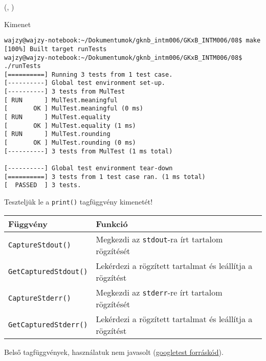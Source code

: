 \documentclass[usenames,dvipsnames,aspectratio=169]{beamer}
\newcommand{\kiemel}[1]{{\color{kiemelesszin}#1}}
\newcommand{\hiv}[1]{{\color{hivatkozasszin}#1}}
\begin{document}
\begin{frame}
  \begin{exampleblock}{ %
    (, %
     )}
    \footnotesize
    
    
    
    
  \end{exampleblock}
\end{frame}

\begin{frame}[fragile]
  \begin{block}{Kimenet}
    \scriptsize
    \begin{verbatim}
wajzy@wajzy-notebook:~/Dokumentumok/gknb_intm006/GKxB_INTM006/08$ make
[100%] Built target runTests
wajzy@wajzy-notebook:~/Dokumentumok/gknb_intm006/GKxB_INTM006/08$ ./runTests 
[==========] Running 3 tests from 1 test case.
[----------] Global test environment set-up.
[----------] 3 tests from MulTest
[ RUN      ] MulTest.meaningful
[       OK ] MulTest.meaningful (0 ms)
[ RUN      ] MulTest.equality
[       OK ] MulTest.equality (1 ms)
[ RUN      ] MulTest.rounding
[       OK ] MulTest.rounding (0 ms)
[----------] 3 tests from MulTest (1 ms total)

[----------] Global test environment tear-down
[==========] 3 tests from 1 test case ran. (1 ms total)
[  PASSED  ] 3 tests.
\end{verbatim}
  \end{block}
\end{frame}

\begin{frame}
  Teszteljük le a \texttt{print()} tagfüggvény kimenetét!
  \vfill
  \begin{tabular}{ll}
    \textbf{Függvény} & \textbf{Funkció}\\ \hline
    \texttt{CaptureStdout()} & Megkezdi az \texttt{stdout}-ra írt tartalom rögzítését\\
    \texttt{GetCapturedStdout()} & Lekérdezi a rögzített tartalmat és leállítja a rögzítést\\
    \texttt{CaptureStderr()} & Megkezdi az \texttt{stderr}-re írt tartalom rögzítését\\
    \texttt{GetCapturedStderr()} & Lekérdezi a rögzített tartalmat és leállítja a rögzítést\\
  \end{tabular}
  \vfill
  Belső tagfüggvények, használatuk \kiemel{nem javasolt} (\hiv{\href{%
https://chromium.googlesource.com/external/github.com/google/googletest/+/HEAD/googletest/include/gtest/internal/gtest-port.h}%
{googletest forráskód}}).
\end{frame}
\end{document}
